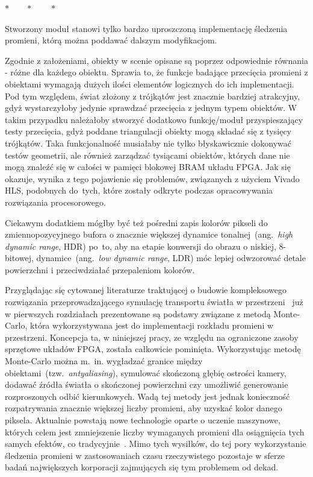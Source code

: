 \begin{center}
$*\qquad *\qquad *$
\end{center}

Stworzony moduł stanowi tylko bardzo uproszczoną implementację śledzenia promieni, którą można poddawać dalszym modyfikacjom. 

Zgodnie z założeniami, obiekty w scenie opisane są poprzez odpowiednie równania - różne dla każdego obiektu. Sprawia to, że funkcje badające przecięcia promieni z obiektami wymagają dużych ilości elementów logicznych do ich implementacji. Pod tym względem, świat złożony z trójkątów jest znacznie bardziej atrakcyjny, gdyż wystarczyłoby jedynie sprawdzać przecięcia z jednym typem obiektów. W takim przypadku należałoby stworzyć dodatkowo funkcję/moduł przyspieszający testy przecięcia, gdyż poddane triangulacji obiekty mogą składać się z tysięcy trójkątów. Taka funkcjonalność musiałaby nie tylko błyskawicznie dokonywać testów geometrii, ale również zarządzać tysiącami obiektów, których dane nie mogą znaleźć się w całości w pamięci blokowej BRAM układu FPGA. Jak się okazuje, wynika z tego pojawienie się problemów, związanych z użyciem Vivado HLS, podobnych do~tych, które zostały odkryte podczas opracowywania rozwiązania procesorowego.

Ciekawym dodatkiem mógłby być też pośredni zapis kolorów pikseli do zmiennopozycyjnego bufora o znacznie większej dynamice tonalnej~(ang.~\textit{high dynamic range}, HDR) po~to, aby na etapie konwersji do obrazu o niskiej, 8-bitowej, dynamice~(ang.~\textit{low dynamic range}, LDR) móc lepiej odwzorować detale powierzchni i przeciwdziałać przepaleniom kolorów.

Przyglądając się cytowanej literaturze traktującej o budowie kompleksowego rozwiązania przeprowadzającego symulację transportu światła w przestrzeni~\cite{PBRT}\cite{RTFTGU} już w pierwszych rozdziałach prezentowane są podstawy związane z metodą Monte-Carlo, która wykorzystywana jest do implementacji rozkładu promieni w przestrzeni. Koncepcja ta, w niniejszej pracy, ze względu na ograniczone zasoby sprzętowe układów FPGA, została całkowicie pominięta. Wykorzystując metodę Monte-Carlo można m.~in. wygładzać granice między obiektami~(tzw.~\textit{antyaliasing}), symulować skończoną głębię ostrości kamery, dodawać źródła światła o skończonej powierzchni czy umożliwić generowanie rozproszonych odbić kierunkowych. Wadą tej metody jest jednak konieczność rozpatrywania znacznie większej liczby promieni, aby uzyskać kolor danego piksela. Aktualnie powstają nowe technologie oparte o uczenie maszynowe, których celem jest zmniejszenie liczby wymaganych promieni dla osiągnięcia tych samych efektów, co tradycyjnie~\cite{NVIDIA_JENSEN}\cite{NVIDIA_DEMO}. Mimo tych wysiłków, do tej pory wykorzystanie śledzenia promieni w zastosowaniach czasu rzeczywistego pozostaje w sferze badań największych korporacji zajmujących się tym problemem od dekad.

